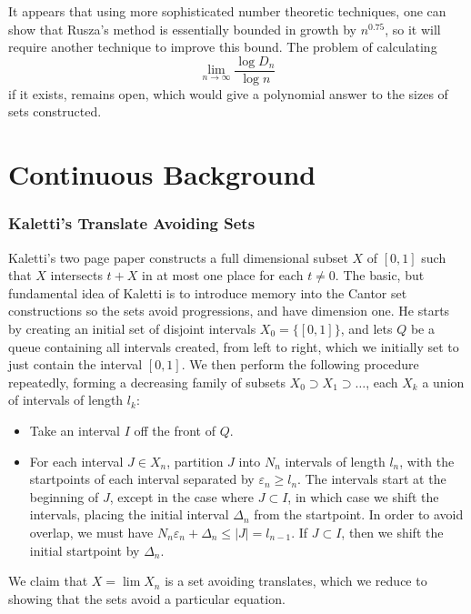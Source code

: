 \documentclass{article}
\theoremstyle{plain}
\theoremstyle{plain}
\begin{document}
It appears that using more sophisticated number theoretic techniques, one can show that Rusza's method is essentially bounded in growth by $n^{0.75}$, so it will require another technique to improve this bound. The problem of calculating
%
\[ \lim_{n \to \infty} \frac{\log D_n}{\log n} \]
%
if it exists, remains open, which would give a polynomial answer to the sizes of sets constructed.

\part{Continuous Background}

\section{Kaletti's Translate Avoiding Sets}

Kaletti's two page paper constructs a full dimensional subset $X$ of $[0,1]$ such that $X$ intersects $t + X$ in at most one place for each $t \neq 0$. The basic, but fundamental idea of Kaletti is to introduce memory into the Cantor set constructions so the sets avoid progressions, and have dimension one. He starts by creating an initial set of disjoint intervals $X_0 = \{ [0,1] \}$, and lets $Q$ be a queue containing all intervals created, from left to right, which we initially set to just contain the interval $[0,1]$. We then perform the following procedure repeatedly, forming a decreasing family of subsets $X_0 \supset X_1 \supset \dots$, each $X_k$ a union of intervals of length $l_k$:
%
\begin{itemize}
    \item Take an interval $I$ off the front of $Q$.
    \item For each interval $J \in X_n$, partition $J$ into $N_n$ intervals of length $l_n$, with the startpoints of each interval separated by $\varepsilon_n \geq l_n$. The intervals start at the beginning of $J$, except in the case where $J \subset I$, in which case we shift the intervals, placing the initial interval $\Delta_n$ from the startpoint. In order to avoid overlap, we must have $N_n \varepsilon_n + \Delta_n \leq |J| = l_{n-1}$. If $J \subset I$, then we shift the initial startpoint by $\Delta_n$.
\end{itemize}
%
We claim that $X = \lim X_n$ is a set avoiding translates, which we reduce to showing that the sets avoid a particular equation.
\end{document}
